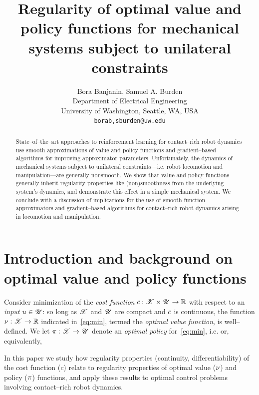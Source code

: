 \documentclass{article}
\title{Regularity of optimal value and policy functions for mechanical systems subject to unilateral constraints}
\author{
  Bora Banjanin, Samuel A. Burden\\
  Department of Electrical Engineering\\
  University of Washington, Seattle, WA, USA\\
  \texttt{borab,sburden@uw.edu} \\
}
\begin{document}
\maketitle


\begin{abstract}
State--of--the--art approaches to reinforcement learning for contact--rich robot dynamics use smooth approximations of value and policy functions and gradient--based algorithms for improving approximator parameters. 
Unfortunately, the dynamics of mechanical systems subject to unilateral constraints---i.e. robot locomotion and manipulation---are generally nonsmooth. %
We show that value and policy functions generally inherit regularity properties like (non)smoothness from the underlying system's dynamics, and demonstrate this effect in a simple mechanical system.
We conclude with a discussion of implications for the use of smooth function approximators and gradient--based algorithms for contact--rich robot dynamics arising in locomotion and manipulation. %
\end{abstract}


\section{Introduction and background on optimal value and policy functions}
\label{sec:value}

Consider minimization of the \emph{cost function} $c:\mathscr{X}\times\mathscr{U}\rightarrow\mathbb{R}$ with respect to an \emph{input} $u\in \mathscr{U}$:
\eqnn{\label{eq:min}
\val(\state) = \min_{\inp\in \Inp} \cost(\state,\inp);
}
so long as $\mathscr{X}$ and $\mathscr{U}$ are compact and $c$ is continuous,
the function $\nu:\mathscr{X}\rightarrow \mathbb{R}$ indicated in~\eqref{eq:min}, termed the \emph{optimal value function}, is well--defined.
%
We let $\pi:\mathscr{X}\rightarrow \mathscr{U}$ denote an \emph{optimal policy} for~\eqref{eq:min}, i.e.
\eqnn{\label{eq:argmin}
\forall \state\in \State : \policy(\state) & \in \arg\min_{\inp\in \Inp} \cost(\state,\inp)\\ 
}
or, equivalently,

In this paper we study how regularity properties (continuity, differentiability) of the cost function ($c$) relate to regularity properties of optimal value ($\nu$) and policy ($\pi$) functions,
and apply these results to optimal control problems involving contact--rich robot dynamics.
\end{document}
